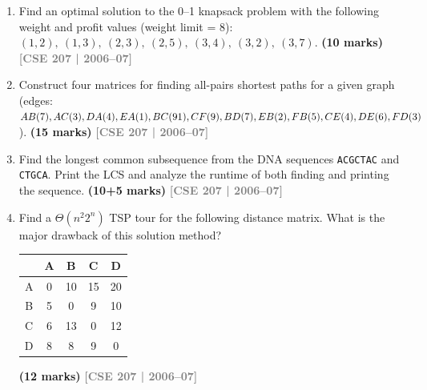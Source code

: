 \documentclass[12pt,a3paper]{article}
\newcommand{\yr}[1]{\hfill\textcolor{gray}{\small\textbf{[#1]}}}
\newcommand{\mk}[1]{\textcolor{orange!70!black}{\small\textbf{(#1 marks)}}}
\begin{document}
\begin{enumerate}
\item Find an optimal solution to the 0--1 knapsack problem with the following weight and profit values (weight limit = 8):
$(1,2),\ (1,3),\ (2,3),\ (2,5),\ (3,4),\ (3,2),\ (3,7)$.
\mk{10}
\yr{CSE 207 | 2006--07}

\item Construct four matrices for finding all-pairs shortest paths for a given graph (edges: $AB(7), AC(3), DA(4), EA(1), BC(91), CF(9), BD(7), EB(2), FB(5),\\ CE(4), DE(6), FD(3)$). \mk{15}
\yr{CSE 207 | 2006--07}

\item Find the longest common subsequence from the DNA sequences \texttt{ACGCTAC} and \texttt{CTGCA}. Print the LCS and analyze the runtime of both finding and printing the sequence. \mk{10+5}
\yr{CSE 207 | 2006--07}

\item Find a $\Theta(n^2 2^n)$ TSP tour for the following distance matrix. What is the major drawback of this solution method?
\begin{center}
\begin{tabular}{ccccc}
\toprule
 & A & B & C & D \\
\midrule
A & 0 & 10 & 15 & 20 \\
B & 5 & 0 & 9 & 10 \\
C & 6 & 13 & 0 & 12 \\
D & 8 & 8 & 9 & 0 \\
\bottomrule
\end{tabular}
\end{center}
\mk{12}
\yr{CSE 207 | 2006--07}

\end{enumerate}
\newpage
\end{document}
